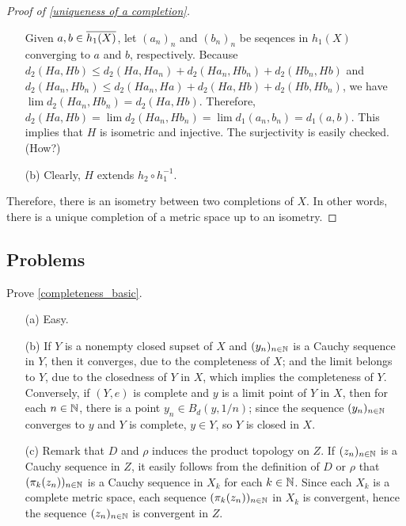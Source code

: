 \begin{proof}[Proof of \cref{uniqueness of a completion}]
\begin{enumerate}
        {
            Given $a, b\in\overline{h_1(X)}$, let $(a_n)_n$ and $(b_n)_n$ be seqences in $h_1(X)$ converging to $a$ and $b$, respectively.
            Because $d_2(Ha, Hb)\leq d_2(Ha, Ha_n)+d_2(Ha_n, Hb_n)+d_2(Hb_n, Hb)$ and $d_2(Ha_n, Hb_n)\leq d_2(Ha_n, Ha)+d_2(Ha, Hb)+d_2(Hb, Hb_n)$, we have $\lim d_2(Ha_n, Hb_n)=d_2(Ha, Hb)$.
            Therefore, $d_2(Ha, Hb)=\lim d_2(Ha_n, Hb_n)=\lim d_1(a_n, b_n)=d_1(a, b)$.
            This implies that $H$ is isometric and injective.
            The surjectivity is easily checked. (How?)
        }
        \item[(b)]
        {
            Clearly, $H$ extends $h_2\circ h_1^{-1}$.
        }
    \end{enumerate}
    Therefore, there is an isometry between two completions of $X$.
    In other words, there is a unique completion of a metric space up to an isometry.
\end{proof}

\subsection{Problems}

\begin{prob}\label{completeness_basic_sol}
    Prove \cref{completeness_basic}.
\end{prob}
\begin{sol}
    \begin{enumerate}
        \item[(a)]
        {
            Easy.
        }
        \item[(b)]
        {
            If $Y$ is a nonempty closed supset of $X$ and $(y_n)_{n\in{\mathbb{N}}}$ is a Cauchy sequence in $Y$, then it converges, due to the completeness of $X$; and the limit belongs to $Y$, due to the closedness of $Y$ in $X$, which implies the completeness of $Y$.
            Conversely, if $(Y, e)$ is complete and $y$ is a limit point of $Y$ in $X$, then for each $n\in{\mathbb{N}}$, there is a point $y_n\in B_d(y, 1/n)$; since the sequence $(y_n)_{n\in{\mathbb{N}}}$ converges to $y$ and $Y$ is complete, $y\in Y$, so $Y$ is closed in $X$.
        }
        \item[(c)]
        {
            Remark that $D$ and $\rho$ induces the product topology on $Z$.
            If $(z_n)_{n\in{\mathbb{N}}}$ is a Cauchy sequence in $Z$, it easily follows from the definition of $D$ or $\rho$ that $(\pi_k(z_n))_{n\in{\mathbb{N}}}$ is a Cauchy sequence in $X_k$ for each $k\in{\mathbb{N}}$.
            Since each $X_k$ is a complete metric space, each sequence $(\pi_k(z_n))_{n\in{\mathbb{N}}}$ in $X_k$ is convergent, hence the sequence $(z_n)_{n\in{\mathbb{N}}}$ is convergent in $Z$.
        }
    \end{enumerate}
\end{sol}